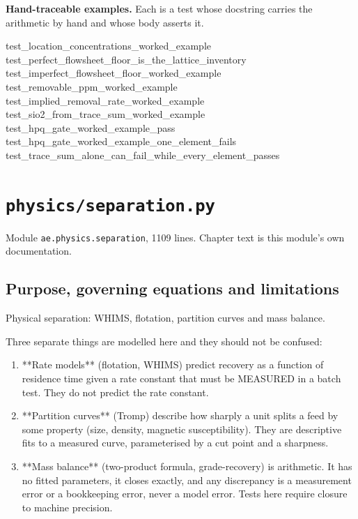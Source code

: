 \documentclass[10pt,a4paper,twoside]{report}
\begin{document}
\normalsize

\textbf{Hand-traceable examples.} Each is a test whose docstring carries the arithmetic by hand and whose body asserts it.

\begin{verbatimsmall}
test_location_concentrations_worked_example
test_perfect_flowsheet_floor_is_the_lattice_inventory
test_imperfect_flowsheet_floor_worked_example
test_removable_ppm_worked_example
test_implied_removal_rate_worked_example
test_sio2_from_trace_sum_worked_example
test_hpq_gate_worked_example_pass
test_hpq_gate_worked_example_one_element_fails
test_trace_sum_alone_can_fail_while_every_element_passes
\end{verbatimsmall}

\clearpage

\chapter{\texttt{physics/separation.py}}\label{ch:separation}


{\footnotesize\color{slate}Module \texttt{ae.physics.separation}, 1109 lines. Chapter text is this module's own documentation.\par}

\section{Purpose, governing equations and limitations}

Physical separation: WHIMS, flotation, partition curves and mass balance.

Three separate things are modelled here and they should not be confused:

\begin{enumerate}[leftmargin=*,label=\arabic*.]
\item **Rate models** (flotation, WHIMS) predict recovery as a function of residence time given a rate constant that must be MEASURED in a batch test. They do not predict the rate constant.
\item **Partition curves** (Tromp) describe how sharply a unit splits a feed by some property (size, density, magnetic susceptibility). They are descriptive fits to a measured curve, parameterised by a cut point and a sharpness.
\item **Mass balance** (two-product formula, grade-recovery) is arithmetic. It has no fitted parameters, it closes exactly, and any discrepancy is a measurement error or a bookkeeping error, never a model error. Tests here require closure to machine precision.
\end{enumerate}
\end{document}
